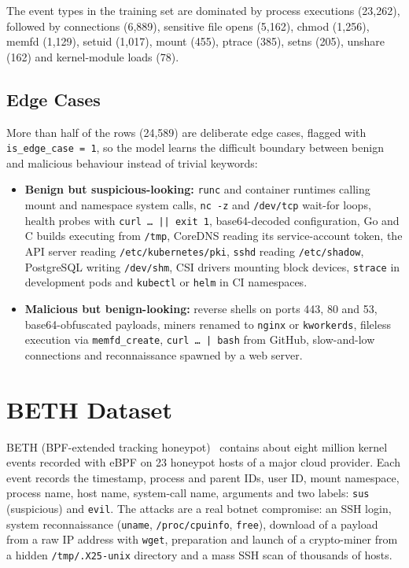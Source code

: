The event types in the training set are dominated by process executions (23,262),
followed by connections (6,889), sensitive file opens (5,162), chmod (1,256), memfd
(1,129), setuid (1,017), mount (455), ptrace (385), setns (205), unshare (162) and
kernel-module loads (78).

\subsection{Edge Cases}

More than half of the rows (24,589) are deliberate edge cases, flagged with
\texttt{is\_edge\_case = 1}, so the model learns the difficult boundary between benign
and malicious behaviour instead of trivial keywords:
\begin{itemize}
    \item \textbf{Benign but suspicious-looking:} \texttt{runc} and container runtimes
          calling mount and namespace system calls, \texttt{nc -z} and \texttt{/dev/tcp}
          wait-for loops, health probes with \texttt{curl \ldots{} || exit 1}, base64-decoded
          configuration, Go and C builds executing from \texttt{/tmp}, CoreDNS reading its
          service-account token, the API server reading \texttt{/etc/kubernetes/pki},
          \texttt{sshd} reading \texttt{/etc/shadow}, PostgreSQL writing \texttt{/dev/shm},
          CSI drivers mounting block devices, \texttt{strace} in development pods and
          \texttt{kubectl} or \texttt{helm} in CI namespaces.
    \item \textbf{Malicious but benign-looking:} reverse shells on ports 443, 80 and 53,
          base64-obfuscated payloads, miners renamed to \texttt{nginx} or
          \texttt{kworkerds}, fileless execution via \texttt{memfd\_create},
          \texttt{curl \ldots{} | bash} from GitHub, slow-and-low connections and
          reconnaissance spawned by a web server.
\end{itemize}

\section{BETH Dataset}

BETH (BPF-extended tracking honeypot)~\cite{highnam2021} contains about eight million
kernel events recorded with eBPF on 23 honeypot hosts of a major cloud provider. Each
event records the timestamp, process and parent IDs, user ID, mount namespace, process
name, host name, system-call name, arguments and two labels: \texttt{sus} (suspicious)
and \texttt{evil}. The attacks are a real botnet compromise: an SSH login, system
reconnaissance (\texttt{uname}, \texttt{/proc/cpuinfo}, \texttt{free}), download of a
payload from a raw IP address with \texttt{wget}, preparation and launch of a
crypto-miner from a hidden \texttt{/tmp/.X25-unix} directory and a mass SSH scan of
thousands of hosts.

